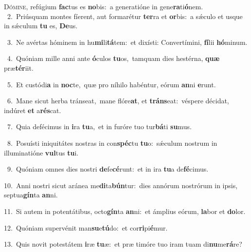 \lettrine{\initial\textcolor{\initialcolor}{D}}{ómine,} refúgium \textbf{fac}\-tus es \textbf{no}\-bis:~\star a generatióne in gene\-\textbf{ra}\-ti\-\textbf{ó}\-nem.\\
{\numbfont\textcolor{\numbcolor}{~2.}}~Priúsquam montes fíerent, aut formarétur \textbf{ter}\-ra et \textbf{or}\-bis:~\star a sǽculo et usque in sǽculum \textbf{tu} es, \textbf{De}\-us.\par
{\numbfont\textcolor{\numbcolor}{~3.}}~Ne avértas hóminem in hu\-\textbf{mi}\-li\-\textbf{tá}\-tem:~\star et dixísti: Convertímini, \textbf{fí}\-lii \textbf{hó}\-minum.\par
{\numbfont\textcolor{\numbcolor}{~4.}}~Quóniam mille anni ante \textbf{ó}\-culos \textbf{tu}\-os,~\star tamquam dies hestérna, \textbf{quæ} præ\-\textbf{tér}\-iit.\par
{\numbfont\textcolor{\numbcolor}{~5.}}~Et custódi\textbf{a} in \textbf{noc}\-te,~\star quæ pro níhilo habéntur, eórum \textbf{an}\-ni \textbf{e}\-runt.\par
{\numbfont\textcolor{\numbcolor}{~6.}}~Mane sicut herba tránseat,~\dagger mane flóre\-\textbf{at}\-, et \textbf{tráns}\-eat:~\star véspere décidat, indúret \textbf{et} a\-\textbf{rés}\-cat.\par
{\numbfont\textcolor{\numbcolor}{~7.}}~Quia defécimus in \textbf{i}\-ra \textbf{tu}\-a,~\star et in furóre tuo tur\-\textbf{bá}\-ti \textbf{su}\-mus.\par
{\numbfont\textcolor{\numbcolor}{~8.}}~Posuísti iniquitátes nostras in con\-\textbf{spéc}\-tu \textbf{tu}\-o:~\star sǽculum nostrum in illuminatióne \textbf{vul}\-tus \textbf{tu}\-i.\par
{\numbfont\textcolor{\numbcolor}{~9.}}~Quóniam omnes dies nostri \textbf{de}\-fe\-\textbf{cé}\-runt:~\star et in ira \textbf{tu}\-a de\-\textbf{fé}\-cimus.\par
{\numbfont\textcolor{\numbcolor}{10.}}~Anni nostri sicut aránea me\-\textbf{di}\-ta\-\textbf{bún}\-tur:~\star dies annórum nostrórum in ipsis, septua\-\textbf{gín}\-ta \textbf{an}\-ni.\par
{\numbfont\textcolor{\numbcolor}{11.}}~Si autem in potentátibus, octo\-\textbf{gín}\-ta \textbf{an}\-ni:~\star et ámplius eórum, \textbf{la}\-bor et \textbf{do}\-lor.\par
{\numbfont\textcolor{\numbcolor}{12.}}~Quóniam supervénit man\-\textbf{su}\-e\-\textbf{tú}\-do:~\star et cor\-\textbf{ri}\-pi\-\textbf{é}\-mur.\par
{\numbfont\textcolor{\numbcolor}{13.}}~Quis novit potestátem \textbf{i}\-ræ \textbf{tu}\-æ:~\star et præ timóre tuo iram tuam di\-\textbf{nu}\-me\-\textbf{rá}\-re?\par
